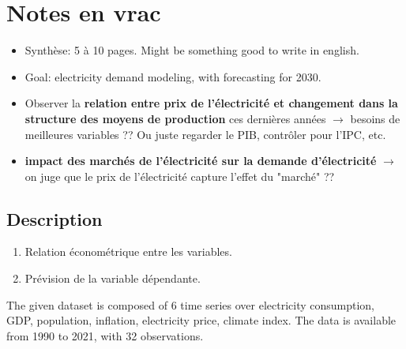 \section{Notes en vrac}
\begin{itemize}
    \item Synthèse: 5 à 10 pages. Might be something good to write in english.
    \item Goal: electricity demand modeling, with forecasting for 2030. 
    \item Observer la \textbf{relation entre prix de l'électricité et changement dans la structure des moyens de production} ces dernières années $\to$ besoins de meilleures variables ?? Ou juste regarder le PIB, contrôler pour l'IPC, etc.
    \item \textbf{impact des marchés de l'électricité sur la demande d'électricité} $\to$ on juge que le prix de l'électricité capture l'effet du "marché" ??
\end{itemize}

\subsection{Description}
\begin{enumerate}
    \item Relation économétrique entre les variables. 
    \item Prévision de la variable dépendante.
\end{enumerate}
The given dataset is composed of 6 time series over electricity consumption, GDP, population, inflation, electricity price, climate index. The data is available from 1990 to 2021, with 32 observations. 

